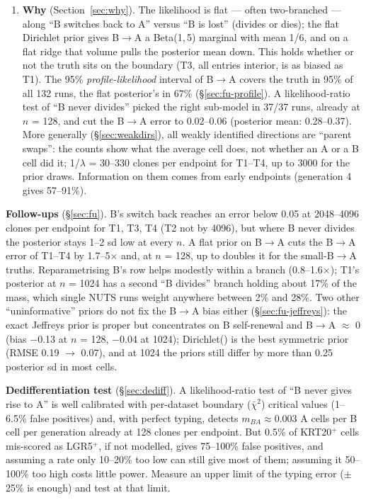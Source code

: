 \documentclass[10pt,a4paper]{article}
\newcommand{\BA}{B$\to$A}
\begin{document}
\begin{enumerate}
\item \textbf{Why} (Section~\ref{sec:why}). The likelihood is flat --- often two-branched --- along ``B switches back to A'' versus ``B is lost'' (divides or dies); the flat Dirichlet prior gives \BA{} a Beta(1,\,5) marginal with mean 1/6, and on a flat ridge that volume pulls the posterior mean down. This holds whether or not the truth sits on the boundary (T3, all entries interior, is as biased as T1). The 95\% \emph{profile-likelihood} interval of \BA{} covers the truth in 95\% of all 132 runs, the flat posterior's in 67\% (\S\ref{sec:fu-profile}). A likelihood-ratio test of ``B never divides'' picked the right sub-model in 37/37 runs, already at $n$ = 128, and cut the \BA{} error to 0.02--0.06 (posterior mean: 0.28--0.37). More generally (\S\ref{sec:weakdirs}), all weakly identified directions are ``parent swaps'': the counts show what the average cell does, not whether an A or a B cell did it; 1/$\lambda$ = 30--330 clones per endpoint for T1--T4, up to 3000 for the prior draws. Information on them comes from early endpoints (generation 4 gives 57--91\%).
\end{enumerate}

\textbf{Follow-ups} (\S\ref{sec:fu}). B's switch back reaches an error below 0.05 at 2048--4096 clones per endpoint for T1, T3, T4 (T2 not by 4096), but where B never divides the posterior stays 1--2 sd low at every $n$. A flat prior on \BA{} cuts the \BA{} error of T1--T4 by 1.7--5$\times$ and, at $n$ = 128, up to doubles it for the small-\BA{} truths. Reparametrising B's row helps modestly within a branch (0.8--1.6$\times$); T1's posterior at $n$ = 1024 has a second ``B divides'' branch holding about 17\% of the mass, which single NUTS runs weight anywhere between 2\% and 28\%. Two other ``uninformative'' priors do not fix the \BA{} bias either (\S\ref{sec:fu-jeffreys}): the exact Jeffreys prior is proper but concentrates on B self-renewal and \BA{} $\approx$ 0 (bias $-$0.13 at $n$ = 128, $-$0.04 at 1024); Dirichlet(\textonehalf) is the best symmetric prior (RMSE 0.19 $\to$ 0.07), and at 1024 the priors still differ by more than 0.25 posterior sd in most cells.

\textbf{Dedifferentiation test} (\S\ref{sec:dediff}). A likelihood-ratio test of ``B never gives rise to A'' is well calibrated with per-dataset boundary ($\bar\chi^2$) critical values (1--6.5\% false positives) and, with perfect typing, detects $m_{BA} \approx 0.003$ A cells per B cell per generation already at 128 clones per endpoint. But 0.5\% of KRT20$^+$ cells mis-scored as LGR5$^+$, if not modelled, gives 75--100\% false positives, and assuming a rate only 10--20\% too low can still give most of them; assuming it 50--100\% too high costs little power. Measure an upper limit of the typing error ($\pm$25\% is enough) and test at that limit.
\end{document}
